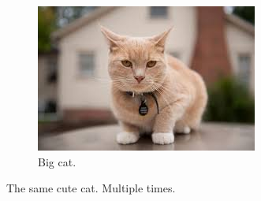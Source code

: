 \begin{figure}[ht!]
  \begin{subfigure}[b]{0.5\linewidth}
    \includegraphics[width=\linewidth]{images/cat.jpg}
    \caption{Big cat.}
  \end{subfigure}

  \caption{The same cute cat. Multiple times.}
  \label{fig:multiple_cats}
\end{figure}